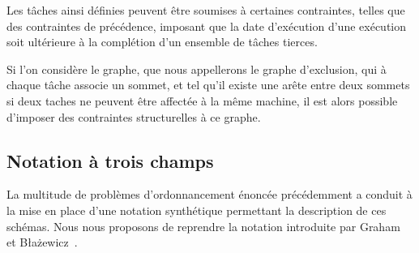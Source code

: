 \documentclass[a4paper,9pt]{report}
\begin{document}
Les tâches ainsi définies peuvent être soumises à certaines contraintes, telles que des contraintes
de précédence, imposant que la date d'exécution d'une exécution soit ultérieure à la complétion
d'un ensemble de tâches tierces.

Si l'on considère le graphe, que nous appellerons le graphe d'exclusion, qui à chaque tâche associe
un sommet, et tel qu'il existe une arête entre deux sommets si deux taches ne peuvent être affectée
à la même machine, il est alors possible d'imposer des contraintes structurelles à ce graphe. 

\subsection{Notation à trois champs}

La multitude de problèmes d'ordonnancement énoncée précédemment a conduit à la mise en place d'une
notation synthétique permettant la description de ces schémas. Nous nous proposons de reprendre la
notation introduite par Graham~\cite{graham} et B\l a\.zewicz~\cite{blazewicz}. 
\end{document}
